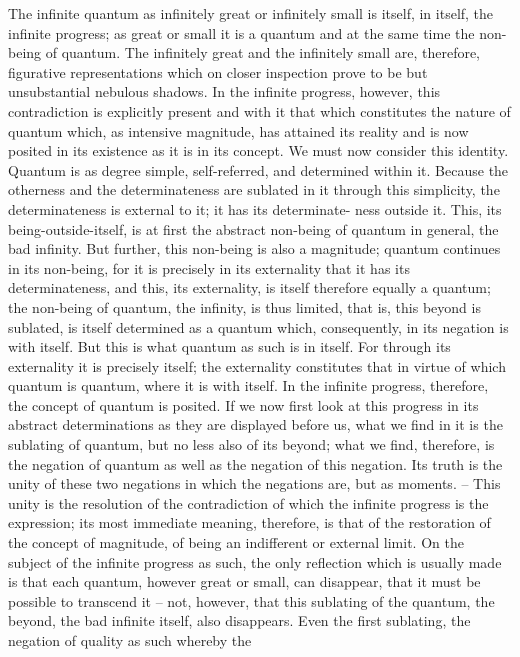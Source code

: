The infinite quantum as infinitely great or infinitely small is itself, in itself,
the infinite progress; as great or small it is a quantum and at the same time
the non-being of quantum. The infinitely great and the infinitely small are,
therefore, figurative representations which on closer inspection prove to be
but unsubstantial nebulous shadows. In the infinite progress, however, this
contradiction is explicitly present and with it that which constitutes the
nature of quantum which, as intensive magnitude, has attained its reality
and is now posited in its existence as it is in its concept. We must now consider
this identity.
Quantum is as degree simple, self-referred, and determined within it.
Because the otherness and the determinateness are sublated in it through
this simplicity, the determinateness is external to it; it has its determinate-
ness outside it. This, its being-outside-itself, is at first the abstract non-being
of quantum in general, the bad infinity. But further, this non-being is also
a magnitude; quantum continues in its non-being, for it is precisely in
its externality that it has its determinateness, and this, its externality, is
itself therefore equally a quantum; the non-being of quantum, the infinity,
is thus limited, that is, this beyond is sublated, is itself determined as a
quantum which, consequently, in its negation is with itself.
But this is what quantum as such is in itself. For through its externality it
is precisely itself; the externality constitutes that in virtue of which quantum
is quantum, where it is with itself. In the infinite progress, therefore, the
concept of quantum is posited.
If we now first look at this progress in its abstract determinations as
they are displayed before us, what we find in it is the sublating of quantum,
but no less also of its beyond; what we find, therefore, is the negation of
quantum as well as the negation of this negation. Its truth is the unity of
these two negations in which the negations are, but as moments. – This
unity is the resolution of the contradiction of which the infinite progress
is the expression; its most immediate meaning, therefore, is that of the
restoration of the concept of magnitude, of being an indifferent or external
limit. On the subject of the infinite progress as such, the only reflection
which is usually made is that each quantum, however great or small, can
disappear, that it must be possible to transcend it – not, however, that
this sublating of the quantum, the beyond, the bad infinite itself, also
disappears.
Even the first sublating, the negation of quality as such whereby the
